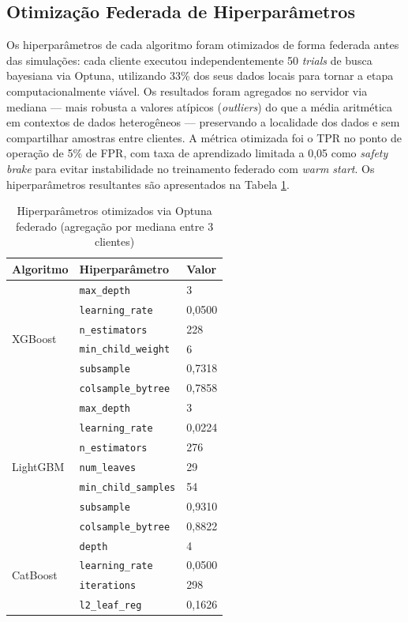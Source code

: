 \subsection{Otimização Federada de Hiperparâmetros}

Os hiperparâmetros de cada algoritmo foram otimizados de forma federada antes das simulações: cada cliente executou independentemente 50 \textit{trials} de busca bayesiana via Optuna, utilizando 33\% dos seus dados locais para tornar a etapa computacionalmente viável. Os resultados foram agregados no servidor via mediana --- mais robusta a valores atípicos (\textit{outliers}) do que a média aritmética em contextos de dados heterogêneos \cite{miao2022byzantine} --- preservando a localidade dos dados e sem compartilhar amostras entre clientes. A métrica otimizada foi o TPR no ponto de operação de 5\% de FPR, com taxa de aprendizado limitada a 0,05 como \textit{safety brake} para evitar instabilidade no treinamento federado com \textit{warm start}. Os hiperparâmetros resultantes são apresentados na Tabela \ref{tab:hyperparams}.

\begin{table}[H]
\centering
\small
\begin{tabularx}{\textwidth}{|l|l|X|}
\hline
\bf Algoritmo & \bf Hiperparâmetro & \bf Valor \\ \hline
\multirow{6}{*}{XGBoost} & \texttt{max\_depth} & 3 \\ \cline{2-3}
 & \texttt{learning\_rate} & 0,0500 \\ \cline{2-3}
 & \texttt{n\_estimators} & 228 \\ \cline{2-3}
 & \texttt{min\_child\_weight} & 6 \\ \cline{2-3}
 & \texttt{subsample} & 0,7318 \\ \cline{2-3}
 & \texttt{colsample\_bytree} & 0,7858 \\ \hline
\multirow{7}{*}{LightGBM} & \texttt{max\_depth} & 3 \\ \cline{2-3}
 & \texttt{learning\_rate} & 0,0224 \\ \cline{2-3}
 & \texttt{n\_estimators} & 276 \\ \cline{2-3}
 & \texttt{num\_leaves} & 29 \\ \cline{2-3}
 & \texttt{min\_child\_samples} & 54 \\ \cline{2-3}
 & \texttt{subsample} & 0,9310 \\ \cline{2-3}
 & \texttt{colsample\_bytree} & 0,8822 \\ \hline
\multirow{4}{*}{CatBoost} & \texttt{depth} & 4 \\ \cline{2-3}
 & \texttt{learning\_rate} & 0,0500 \\ \cline{2-3}
 & \texttt{iterations} & 298 \\ \cline{2-3}
 & \texttt{l2\_leaf\_reg} & 0,1626 \\ \hline
\end{tabularx}
\caption{Hiperparâmetros otimizados via Optuna federado (agregação por mediana entre 3 clientes)}
\label{tab:hyperparams}
\end{table}

